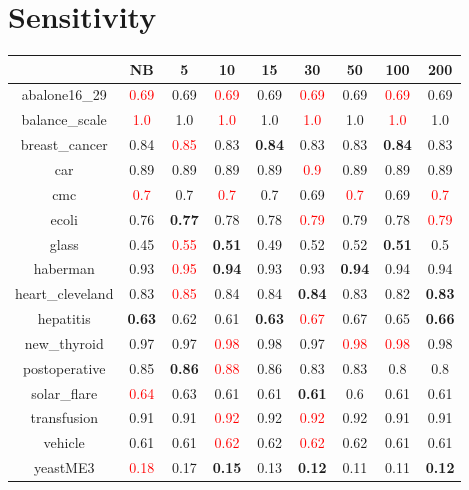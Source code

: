 \documentclass{article}%
\begin{document}
\section*{Sensitivity}%
\begin{tabular}{c|cccccccc}%
\hline%
&NB&5&10&15&30&50&100&200\\%
\hline%
abalone16\_29&\textcolor{red}{ 
0.69
}&0.69&\textcolor{red}{ 
0.69
}&0.69&\textcolor{red}{ 
0.69
}&0.69&\textcolor{red}{ 
0.69
}&0.69\\%
\hline%
balance\_scale&\textcolor{red}{ 
1.0
}&1.0&\textcolor{red}{ 
1.0
}&1.0&\textcolor{red}{ 
1.0
}&1.0&\textcolor{red}{ 
1.0
}&1.0\\%
\hline%
breast\_cancer&0.84&\textcolor{red}{ 
0.85
}&0.83&\textbf{0.84}&0.83&0.83&\textbf{0.84}&0.83\\%
\hline%
car&0.89&0.89&0.89&0.89&\textcolor{red}{ 
0.9
}&0.89&0.89&0.89\\%
\hline%
cmc&\textcolor{red}{ 
0.7
}&0.7&\textcolor{red}{ 
0.7
}&0.7&0.69&\textcolor{red}{ 
0.7
}&0.69&\textcolor{red}{ 
0.7
}\\%
\hline%
ecoli&0.76&\textbf{0.77}&0.78&0.78&\textcolor{red}{ 
0.79
}&0.79&0.78&\textcolor{red}{ 
0.79
}\\%
\hline%
glass&0.45&\textcolor{red}{ 
0.55
}&\textbf{0.51}&0.49&0.52&0.52&\textbf{0.51}&0.5\\%
\hline%
haberman&0.93&\textcolor{red}{ 
0.95
}&\textbf{0.94}&0.93&0.93&\textbf{0.94}&0.94&0.94\\%
\hline%
heart\_cleveland&0.83&\textcolor{red}{ 
0.85
}&0.84&0.84&\textbf{0.84}&0.83&0.82&\textbf{0.83}\\%
\hline%
hepatitis&\textbf{0.63}&0.62&0.61&\textbf{0.63}&\textcolor{red}{ 
0.67
}&0.67&0.65&\textbf{0.66}\\%
\hline%
new\_thyroid&0.97&0.97&\textcolor{red}{ 
0.98
}&0.98&0.97&\textcolor{red}{ 
0.98
}&\textcolor{red}{ 
0.98
}&0.98\\%
\hline%
postoperative&0.85&\textbf{0.86}&\textcolor{red}{ 
0.88
}&0.86&0.83&0.83&0.8&0.8\\%
\hline%
solar\_flare&\textcolor{red}{ 
0.64
}&0.63&0.61&0.61&\textbf{0.61}&0.6&0.61&0.61\\%
\hline%
transfusion&0.91&0.91&\textcolor{red}{ 
0.92
}&0.92&\textcolor{red}{ 
0.92
}&0.92&0.91&0.91\\%
\hline%
vehicle&0.61&0.61&\textcolor{red}{ 
0.62
}&0.62&\textcolor{red}{ 
0.62
}&0.62&0.61&0.61\\%
\hline%
yeastME3&\textcolor{red}{ 
0.18
}&0.17&\textbf{0.15}&0.13&\textbf{0.12}&0.11&0.11&\textbf{0.12}\\%

\end{tabular}
\end{document}
